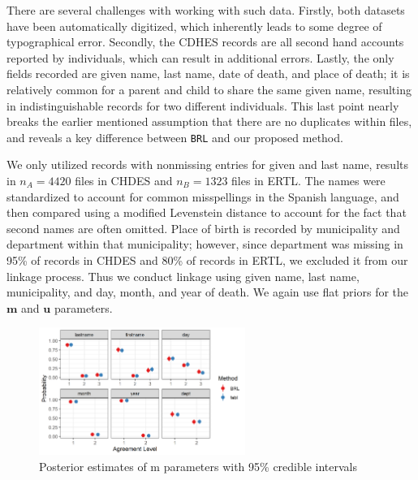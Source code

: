 \documentclass[12pt,letterpaper]{article}
\newcommand{\1}[1]{\mathbb{I}\!\left[#1\right]} %
\begin{document}
There are several challenges with working with such data. Firstly, both
datasets have been automatically digitized, which inherently leads to
some degree of typographical error. Secondly, the CDHES records are all
second hand accounts reported by individuals, which can result in
additional errors. Lastly, the only fields recorded are given name, last
name, date of death, and place of death; it is relatively common for a
parent and child to share the same given name, resulting in
indistinguishable records for two different individuals. This last point
nearly breaks the earlier mentioned assumption that there are no
duplicates within files, and reveals a key difference between
\texttt{BRL} and our proposed method.

We only utilized records with nonmissing entries for given and last
name, results in \(n_A = 4420\) files in CHDES and \(n_B = 1323\) files
in ERTL. The names were standardized to account for common misspellings
in the Spanish language, and then compared using a modified Levenstein
distance to account for the fact that second names are often omitted.
Place of birth is recorded by municipality and department within that
municipality; however, since department was missing in 95\% of records
in CHDES and 80\% of records in ERTL, we excluded it from our linkage
process. Thus we conduct linkage using given name, last name,
municipality, and day, month, and year of death. We again use flat
priors for the \(\mathbf{m}\) and \(\mathbf{u}\) parameters.

\begin{figure}[t]
	
	{\centering \includegraphics[width=0.6\textwidth]{../notes/figures/el_salvador/m_posterior_smallP} 
		
	}
	
	\caption{Posterior estimates of m parameters with 95\% credible intervals}\label{fig:m-and-u}
\end{figure}
\end{document}
